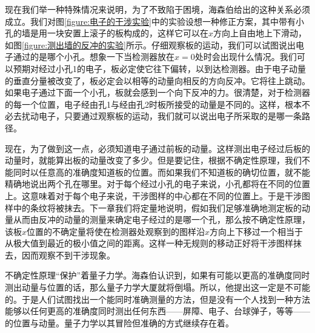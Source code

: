 现在我们举一种特殊情况来说明，为了不致陷于困境，海森伯给出的这种关系必须成立。我们对图\ref{figure:电子的干涉实验}中的实验设想一种修正方案，其中带有小孔的墙是用一块安置上滚子的板构成的，这样它可以在$x$方向上自由地上下滑动，如图\ref{figure:测出墙的反冲的实验}所示。仔细观察板的运动，我们可以试图说出电子通过的是哪个小孔。想象一下当检测器放在$x=0$处时会出现什么情况。我们可以预期对经过小孔1的电子，板必定使它往下偏转，以到达检测器。由于电子动量的垂直分量被改变了，板必定会以相等的动量向相反的方向反冲。它将往上跳动。如果电子通过下面一个小孔，板就会感到一个向下反冲的力。很清楚，对于检测器的每一个位置，电子经由孔1与经由孔2时板所接受的动量是不同的。这样，根本不必去扰动电子，只要通过观察板的运动，我们就可以说出电子所采取的是哪一条路径。

现在，为了做到这一点，必须知道电子通过前板的动量。这样测出电子经过后板的动量时，就能算出板的动量改变了多少。但是要记住，根据不确定性原理，我们不能同时以任意高的准确度知道板的位置。而如果我们不知道板的确切位置，就不能精确地说出两个孔在哪里。对于每个经过小孔的电子来说，小孔都将在不同的位置上。这意味着对于每个电子来说，干涉图样的中心都在不同的位置上。于是干涉图样中的条纹将被抹去。下一章我们将定量地说明，假如我们足够准确地测定板的动量从而由反冲的动量的测量来确定电子经过的是哪一个孔，那么按不确定性原理，该板$x$位置的不确定量将使在检测器处观察到的图样沿$x$方向上下移过一个相当于从极大值到最近的极小值之间的距离。这样一种无规则的移动正好将干涉图样抹去，因而观察不到干涉现象。

不确定性原理“保护”着量子力学。海森伯认识到，如果有可能以更高的准确度同时测出动量与位置的话，那么量子力学大厦就将倒塌。所以，他提出这一定是不可能的。于是人们试图找出一个能同时准确测量的方法，但是没有一个人找到一种方法能够以任何更高的准确度同时测出任何东西——屏障、电子、台球弹子，等等——的位置与动量。量子力学以其冒险但准确的方式继续存在着。